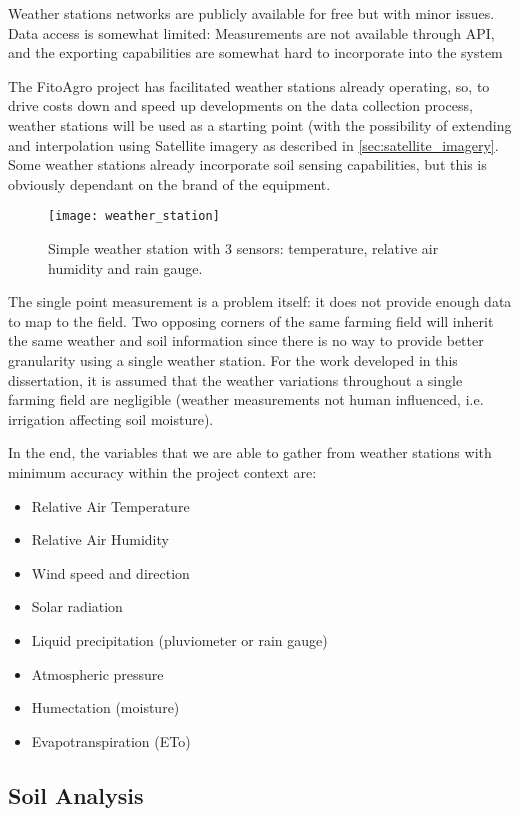 Weather stations networks are publicly available for free but with minor issues. Data access is somewhat limited: Measurements are not available through API, and the exporting capabilities are somewhat hard to incorporate into the system

The FitoAgro project has facilitated weather stations already operating, so, to drive costs down and speed up developments on the data collection process, weather stations will be used as a starting point (with the possibility of extending and interpolation using Satellite imagery as described in \ref{sec:satellite_imagery}. Some weather stations already incorporate soil sensing capabilities, but this is obviously dependant on the brand of the equipment.

\begin{figure}[htbp]
  \centering
  \texttt{[image: weather\_station]}
  \caption{Simple weather station with 3 sensors: temperature, relative air humidity and rain gauge.}
  \label{fig:weather_station}
\end{figure}

The single point measurement is a problem itself: it does not provide enough data to map to the field. Two opposing corners of the same farming field will inherit the same weather and soil information since there is no way to provide better granularity using a single weather station. For the work developed in this dissertation, it is assumed that the weather variations throughout a single farming field are negligible (weather measurements not human influenced, i.e. irrigation affecting soil moisture).

In the end, the variables that we are able to gather from weather stations with minimum accuracy within the project context are:

\begin{itemize}
	\item Relative Air Temperature
	\item Relative Air Humidity
	\item Wind speed and direction
	\item Solar radiation
	\item Liquid precipitation (pluviometer or rain gauge)
	\item Atmospheric pressure
	\item Humectation (moisture)
	\item Evapotranspiration (ETo)
\end{itemize}

\subsection{Soil Analysis}
\label{sec:soil_station}

